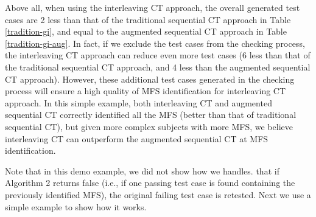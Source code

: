 \documentclass[10pt,journal,compsoc]{IEEEtran}
\begin{document}

Above all, when using the interleaving CT approach,  the overall generated test cases are 2 less than that of the traditional sequential CT approach in Table \ref{tradition-gi}, and equal to the augmented sequential CT approach in Table \ref{tradition-gi-aug}. In fact, if we exclude the test cases from the checking process, the interleaving CT approach can reduce even more test cases (6 less than that of the traditional sequential CT approach, and 4 less than the augmented sequential CT approach). However, these additional test cases generated in the checking process will ensure a high quality of MFS identification for interleaving CT approach. In this simple example, both interleaving CT and augmented sequential CT  correctly identified all the MFS (better than that of traditional sequential CT), but given more complex subjects with more MFS, we believe interleaving CT can outperform the augmented sequential CT at MFS identification.

{\color{\blue}Note that in this demo example, we did not show how we handles.  that if Algorithm 2 returns false (i.e., if one passing test case is found containing the previously identified MFS), the original failing test case is retested. Next we use a simple example to show how it works.}


\end{document}
